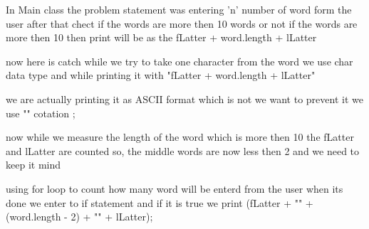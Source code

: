 In Main class 
the problem statement was entering 'n' number of word form the user 
after that chect if the words are more then 10 words or not if the words are more then 10 then 
print will be as the fLatter + word.length + lLatter

now here is catch while we try to take one character from the word we use char data type 
and while printing it with "fLatter + word.length + lLatter" 

we are actually printing it as ASCII format which is not we want 
to prevent it we use "" cotation ;

now while we measure the length of the word which is more then 10 
the fLatter and lLatter are counted 
so, the middle words are now less then 2 and we need to keep it mind


using for loop to count how many word will be enterd from the user 
when its done we enter to if statement and if it is true 
we print (fLatter + "" + (word.length - 2) + "" + lLatter);